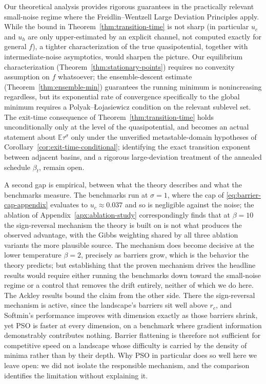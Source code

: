\documentclass{opt2026} %
\newcommand{\E}{\mathbb{E}}
\begin{document}
Our theoretical analysis provides rigorous guarantees in the practically relevant small-noise regime where the Freidlin--Wentzell Large Deviation Principles apply. While the bound in Theorem~\ref{thm:transition-time} is not sharp (in particular $u_c$ and $u_h$ are only upper-estimated by an explicit channel, not computed exactly for general $f$), a tighter characterization of the true quasipotential, together with intermediate-noise asymptotics, would sharpen the picture. Our equilibrium characterization (Theorem~\ref{thm:stationary-points}) requires no convexity assumption on $f$ whatsoever; the ensemble-descent estimate (Theorem~\ref{thm:ensemble-min}) guarantees the running minimum is nonincreasing regardless, but its exponential rate of convergence specifically to the global minimum requires a Polyak--\L{}ojasiewicz condition on the relevant sublevel set. The exit-time consequence of Theorem~\ref{thm:transition-time} holds unconditionally only at the level of the quasipotential, and becomes an actual statement about $\E\tau^\sigma$ only under the unverified metastable-domain hypotheses of Corollary~\ref{cor:exit-time-conditional}; identifying the exact transition exponent between adjacent basins, and a rigorous large-deviation treatment of the annealed schedule $\beta_t$, remain open.

A second gap is empirical, between what the theory describes and what the benchmarks measure. The benchmarks run at $\sigma=1$, where the cap of \eqref{eq:barrier-cap-appendix} evaluates to $u_c\approx0.037$ and so is negligible against the noise; the ablation of Appendix~\ref{apx:ablation-study} correspondingly finds that at $\beta=10$ the sign-reversal mechanism the theory is built on is not what produces the observed advantage, with the Gibbs weighting shared by all three ablation variants the more plausible source. The mechanism does become decisive at the lower temperature $\beta=2$, precisely as barriers grow, which is the behavior the theory predicts; but establishing that the proven mechanism drives the headline results would require either running the benchmarks down toward the small-noise regime or a control that removes the drift entirely, neither of which we do here. The Ackley results bound the claim from the other side. There the sign-reversal mechanism is active, since the landscape's barriers sit well above $r_c$, and Softmin's performance improves with dimension exactly as those barriers shrink, yet PSO is faster at every dimension, on a benchmark where gradient information demonstrably contributes nothing. Barrier flattening is therefore not sufficient for competitive speed on a landscape whose difficulty is carried by the density of minima rather than by their depth. Why PSO in particular does so well here we leave open: we did not isolate the responsible mechanism, and the comparison identifies the limitation without explaining it.
\end{document}
